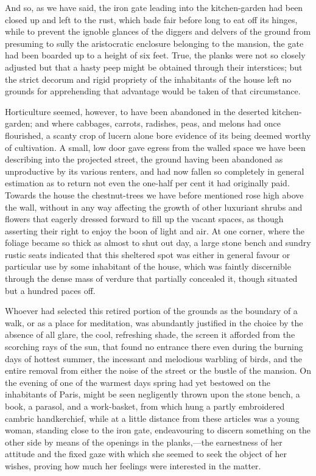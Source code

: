  And so, as we have said, the iron gate leading into the kitchen-garden had been closed up and left to the rust, which bade fair before long to eat off its hinges, while to prevent the ignoble glances of the diggers and delvers of the ground from presuming to sully the aristocratic enclosure belonging to the mansion, the gate had been boarded up to a height of six feet. True, the planks were not so closely adjusted but that a hasty peep might be obtained through their interstices; but the strict decorum and rigid propriety of the inhabitants of the house left no grounds for apprehending that advantage would be taken of that circumstance. 

 Horticulture seemed, however, to have been abandoned in the deserted kitchen-garden; and where cabbages, carrots, radishes, peas, and melons had once flourished, a scanty crop of lucern alone bore evidence of its being deemed worthy of cultivation. A small, low door gave egress from the walled space we have been describing into the projected street, the ground having been abandoned as unproductive by its various renters, and had now fallen so completely in general estimation as to return not even the one-half per cent it had originally paid. Towards the house the chestnut-trees we have before mentioned rose high above the wall, without in any way affecting the growth of other luxuriant shrubs and flowers that eagerly dressed forward to fill up the vacant spaces, as though asserting their right to enjoy the boon of light and air. At one corner, where the foliage became so thick as almost to shut out day, a large stone bench and sundry rustic seats indicated that this sheltered spot was either in general favour or particular use by some inhabitant of the house, which was faintly discernible through the dense mass of verdure that partially concealed it, though situated but a hundred paces off. 

 Whoever had selected this retired portion of the grounds as the boundary of a walk, or as a place for meditation, was abundantly justified in the choice by the absence of all glare, the cool, refreshing shade, the screen it afforded from the scorching rays of the sun, that found no entrance there even during the burning days of hottest summer, the incessant and melodious warbling of birds, and the entire removal from either the noise of the street or the bustle of the mansion. On the evening of one of the warmest days spring had yet bestowed on the inhabitants of Paris, might be seen negligently thrown upon the stone bench, a book, a parasol, and a work-basket, from which hung a partly embroidered cambric handkerchief, while at a little distance from these articles was a young woman, standing close to the iron gate, endeavouring to discern something on the other side by means of the openings in the planks,—the earnestness of her attitude and the fixed gaze with which she seemed to seek the object of her wishes, proving how much her feelings were interested in the matter. 

